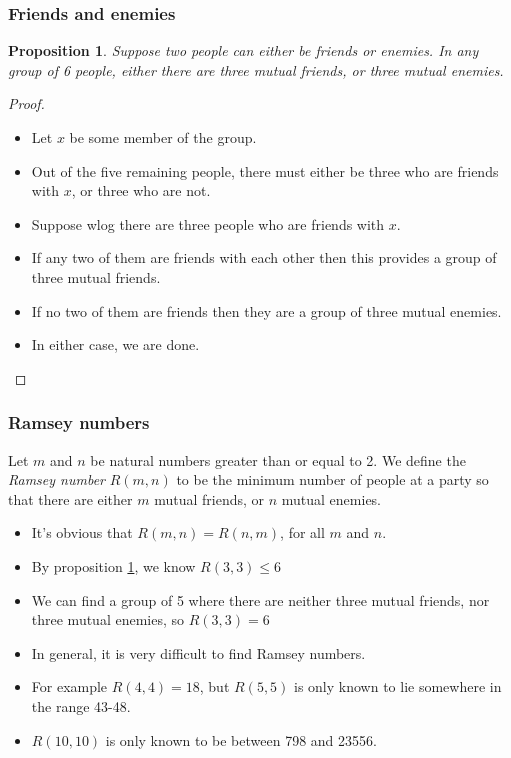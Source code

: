 \documentclass[handout]{beamer}
\newtheorem{proposition}[theorem]{Proposition}
\begin{document}
\begin{frame}
\frametitle{Friends and enemies}
\begin{proposition}\label{P:Ramsey}
Suppose two people can either be friends or enemies. In any group of 6 people, either there are three mutual friends, or three mutual enemies.
\end{proposition}
\begin{proof}
\begin{itemize}
\item Let $x$ be some member of the group. 
\item Out of the five remaining people, there must either be three who are friends with $x$, or three who are not. 
\item Suppose wlog there are three people who are friends with $x$. 
\item If any two of them are friends with each other then this provides a group of three mutual friends. 
\item If no two of them are friends then they are a group of three mutual enemies. 
\item In either case, we are done.
\end{itemize} 
\end{proof}
\end{frame}

\begin{frame}
\frametitle{Ramsey numbers}
\begin{definition}
Let $m$ and $n$ be natural numbers greater than or equal to 2. We define the \emph{Ramsey number} $R(m,n)$ to be the minimum number of people at a party so that there are either $m$ mutual friends, or $n$ mutual enemies.  
\end{definition}
\begin{itemize}
\item It's obvious that $R(m,n)=R(n,m)$, for all $m$ and $n$. 
\item By proposition \ref{P:Ramsey}, we know $R(3,3)\leq 6$ 
\item We can find a group of 5 where there are neither three mutual friends, nor three mutual enemies, so $R(3,3)=6$
\item In general, it is very difficult to find Ramsey numbers.
\item For example $R(4,4) = 18$, but $R(5,5)$ is only known to lie somewhere in the range 43-48.
\item $R(10,10)$ is only known to be between 798 and 23556. 
\end{itemize}
\end{frame}
\end{document}
